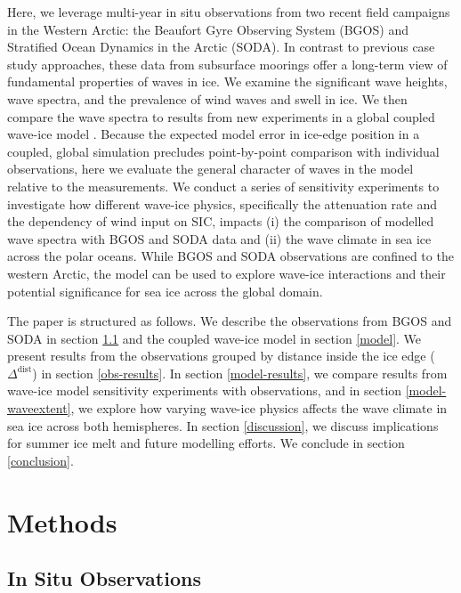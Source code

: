 \documentclass [11pt, proquest] {uwthesis}[2020/02/24]
\begin{document}
Here, we leverage multi-year in situ observations from two recent field campaigns in the Western Arctic: the Beaufort Gyre Observing System (BGOS) and Stratified Ocean Dynamics in the Arctic (SODA). In contrast to previous case study approaches, these data from subsurface moorings offer a long-term view of fundamental properties of waves in ice. We examine the significant wave heights, wave spectra, and the prevalence of wind waves and swell in ice. We then compare the wave spectra to results from new experiments in a global coupled wave-ice model \cite{Roach2019}. Because the expected model error in ice-edge position in a coupled, global simulation precludes point-by-point comparison with individual observations, here we evaluate the general character of waves in the model relative to the measurements. We conduct a series of sensitivity experiments to investigate how different wave-ice physics, specifically the attenuation rate and the dependency of wind input on SIC, impacts (i) the comparison of modelled wave spectra with BGOS and SODA data and (ii) the wave climate in sea ice across the polar oceans. While BGOS and SODA observations are confined to the western Arctic, the model can be used to explore wave-ice interactions and their potential significance for sea ice across the global domain.  

The paper is structured as follows. We describe the observations from BGOS and SODA in section \ref{obs} and the coupled wave-ice model in section \ref{model}. We present results from the observations grouped by distance inside the ice edge ($\Delta^{\mathrm{dist}}$) in section \ref{obs-results}. In section \ref{model-results}, we compare results from wave-ice model sensitivity experiments with observations, and in section \ref{model-waveextent}, we explore how varying wave-ice physics affects the wave climate in sea ice across both hemispheres. In section \ref{discussion}, we discuss implications for summer ice melt and future modelling efforts. We conclude in section \ref{conclusion}.  

 
\chapter{Methods}\label{sec:meth}
 
\section{In Situ Observations} \label{obs}
\end{document}
